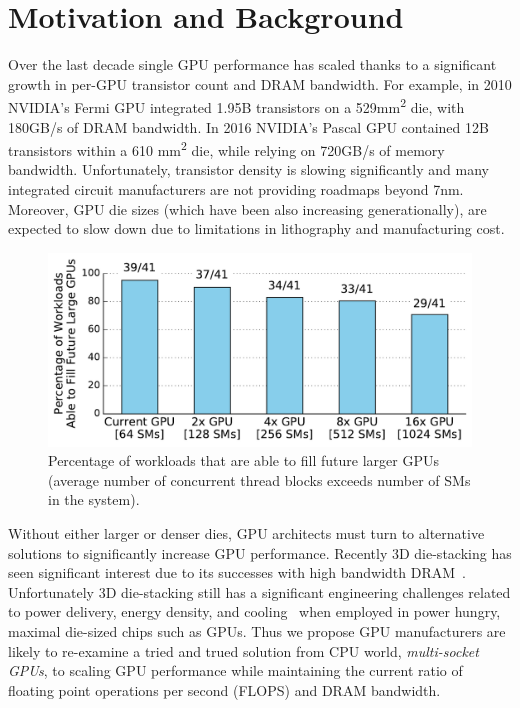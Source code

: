 \section{Motivation and Background}
\label{sec:background}

Over the last decade single GPU performance has scaled thanks to a 
significant growth in per-GPU transistor count and DRAM bandwidth. For example, 
in 2010 NVIDIA's Fermi GPU integrated 1.95B transistors on a 
529mm\textsuperscript{2} die, with 180GB/s of DRAM bandwidth.  In 2016 NVIDIA's 
Pascal GPU contained 12B transistors within a 610 mm\textsuperscript{2} die, while 
relying on 720GB/s of memory bandwidth. Unfortunately, transistor density is 
slowing significantly and many integrated circuit manufacturers are not providing roadmaps beyond 7nm. 
Moreover, GPU die sizes (which have been also increasing generationally), are 
expected to slow down due to limitations in lithography and manufacturing cost.

\begin{figure}[t] 
    \centering
    \includegraphics[width=1.0\columnwidth]{figures/plot_ctas_per_sm.pdf}
    \caption{Percentage of workloads that are able to fill future larger GPUs 
    (average number of concurrent thread blocks exceeds number of SMs in the system).}
    \label{fig:ctas}
    \vspace{-.2in}
\end{figure}

Without either larger or denser dies, GPU architects must turn to 
alternative solutions to significantly increase GPU performance.  Recently 3D 
die-stacking has seen significant interest due to its successes with high 
bandwidth DRAM~\cite{HBM}. Unfortunately 3D die-stacking still has 
a significant engineering challenges related to power delivery, 
energy density, and cooling~\cite{verbree2010cost} when employed in power 
hungry, maximal die-sized chips such as GPUs. Thus we propose GPU manufacturers 
are likely to re-examine a tried and trued solution from CPU world, 
\textit{multi-socket GPUs}, to scaling GPU performance while maintaining the 
current ratio of floating point operations per second (FLOPS) and DRAM 
bandwidth.

